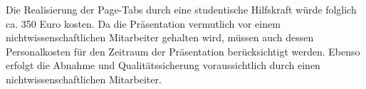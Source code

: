 Die Realisierung der Page-Tabs durch eine studentische Hilfskraft würde folglich ca. 350 Euro kosten. Da die Präsentation vermutlich vor einem nichtwissenschaftlichen Mitarbeiter gehalten wird, müssen auch dessen Personalkosten für den Zeitraum der Präsentation berücksichtigt werden. Ebenso erfolgt die Abnahme und Qualitätssicherung voraussichtlich durch einen nichtwissenschaftlichen Mitarbeiter.
